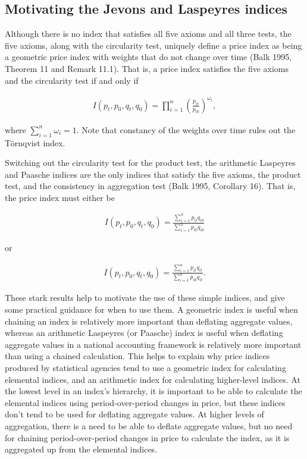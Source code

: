 \documentclass[]{article}
\begin{document}
\hypertarget{motivating-the-jevons-and-laspeyres-indices}{%
\subsection{Motivating the Jevons and Laspeyres indices}\label{motivating-the-jevons-and-laspeyres-indices}}

Although there is no index that satisfies all five axioms and all three tests, the five axioms, along with the circularity test, uniquely define a price index as being a geometric price index with weights that do not change over time (Balk 1995, Theorem 11 and Remark 11.1). That is, a price index satisfies the five axioms and the circularity test if and only if

\begin{align*}
I(p_{t}, p_{0}, q_{t}, q_{0}) = \prod_{i = 1}^{n} \left(\frac{p_{it}}{p_{i0}}\right)^{\omega_{i}},
\end{align*}

where \(\sum_{i = 1}^{n} \omega_{i} = 1\). Note that constancy of the weights over time rules out the Törnqvist index.

Switching out the circularity test for the product test, the arithmetic Laspeyres and Paasche indices are the only indices that satisfy the five axioms, the product test, and the consistency in aggregation test (Balk 1995, Corollary 16). That is, the price index must either be

\begin{align*}
I(p_{t}, p_{0}, q_{t}, q_{0}) = \frac{\sum_{i = 1}^{n} p_{it}q_{i0}}{\sum_{i = 1}^{n} p_{i0}q_{i0}}
\end{align*}

or

\begin{align*}
I(p_{t}, p_{0}, q_{t}, q_{0}) = \frac{\sum_{i = 1}^{n} p_{it}q_{it}}{\sum_{i = 1}^{n} p_{i0}q_{it}}.
\end{align*}

These stark results help to motivate the use of these simple indices, and give some practical guidance for when to use them. A geometric index is useful when chaining an index is relatively more important than deflating aggregate values, whereas an arithmetic Laspeyres (or Paasche) index is useful when deflating aggregate values in a national accounting framework is relatively more important than using a chained calculation. This helps to explain why price indices produced by statistical agencies tend to use a geometric index for calculating elemental indices, and an arithmetic index for calculating higher-level indices. At the lowest level in an index's hierarchy, it is important to be able to calculate the elemental indices using period-over-period changes in price, but these indices don't tend to be used for deflating aggregate values. At higher levels of aggregation, there is a need to be able to deflate aggregate values, but no need for chaining period-over-period changes in price to calculate the index, as it is aggregated up from the elemental indices.
\end{document}
